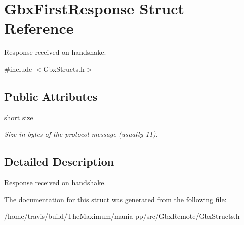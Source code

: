 \hypertarget{structGbxFirstResponse}{\section{Gbx\-First\-Response Struct Reference}
\label{structGbxFirstResponse}
}


Response received on handshake.  




{\ttfamily \#include $<$Gbx\-Structs.\-h$>$}

\subsection*{Public Attributes}
\begin{DoxyCompactItemize}
\item 
\hypertarget{structGbxFirstResponse_ad93a9c67024b28ecddb779457dd001f8}{short \hyperlink{structGbxFirstResponse_ad93a9c67024b28ecddb779457dd001f8}{size}}\label{structGbxFirstResponse_ad93a9c67024b28ecddb779457dd001f8}

\begin{DoxyCompactList}\small\item\em Size in bytes of the protocol message (usually 11). \end{DoxyCompactList}\end{DoxyCompactItemize}


\subsection{Detailed Description}
Response received on handshake. 

The documentation for this struct was generated from the following file\-:\begin{DoxyCompactItemize}
\item 
/home/travis/build/\-The\-Maximum/mania-\/pp/src/\-Gbx\-Remote/Gbx\-Structs.\-h\end{DoxyCompactItemize}
